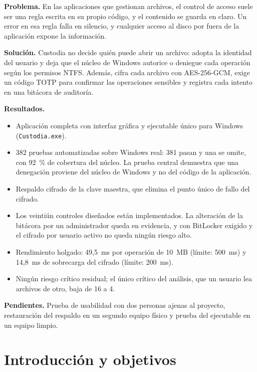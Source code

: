 \documentclass[conference]{IEEEtran}
\begin{document}
\textbf{Problema.} En las aplicaciones que gestionan archivos, el control de acceso suele ser una regla escrita en su propio código, y el contenido se guarda en claro. Un error en esa regla falla en silencio, y cualquier acceso al disco por fuera de la aplicación expone la información.

\textbf{Solución.} Custodia no decide quién puede abrir un archivo: adopta la identidad del usuario y deja que el núcleo de Windows autorice o deniegue cada operación según los permisos NTFS. Además, cifra cada archivo con AES-256-GCM, exige un código TOTP para confirmar las operaciones sensibles y registra cada intento en una bitácora de auditoría.

\textbf{Resultados.}
\begin{itemize}
    \item Aplicación completa con interfaz gráfica y ejecutable único para Windows (\texttt{Custodia.exe}).
    \item 382 pruebas automatizadas sobre Windows real: 381 pasan y una se omite, con 92~\% de cobertura del núcleo. La prueba central demuestra que una denegación proviene del núcleo de Windows y no del código de la aplicación.
    \item Respaldo cifrado de la clave maestra, que elimina el punto único de fallo del cifrado.
    \item Los veintiún controles diseñados están implementados. La alteración de la bitácora por un administrador queda en evidencia, y con BitLocker exigido y el cifrado por usuario activo no queda ningún riesgo alto.
    \item Rendimiento holgado: 49,5~ms por operación de 10~MB (límite: 500~ms) y 14,8~ms de sobrecarga del cifrado (límite: 200~ms).
    \item Ningún riesgo crítico residual; el único crítico del análisis, que un usuario lea archivos de otro, baja de 16 a 4.
\end{itemize}

\textbf{Pendientes.} Prueba de usabilidad con dos personas ajenas al proyecto, restauración del respaldo en un segundo equipo físico y prueba del ejecutable en un equipo limpio.

\section{Introducción y objetivos}
\label{sec:intro}
\end{document}
